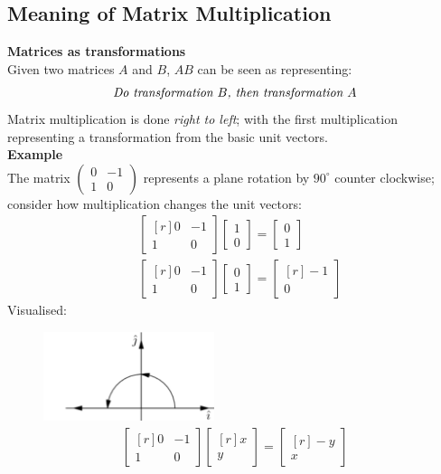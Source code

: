 \documentclass{report}
\begin{document}
\subsection{Meaning of Matrix Multiplication} %
\textbf{Matrices as transformations}\\
Given two matrices $A$ and $B$, $AB$ can be seen as 
representing:
\begin{equation*}
\text{\textit{Do transformation $B$, then transformation $A$}}
\end{equation*}
Matrix multiplication is done \textit{right to left}; with the first multiplication representing
a transformation from the basic unit vectors.\\
\textbf{Example}\\
The matrix $\left(\begin{smallmatrix}0&-1\\1&0\end{smallmatrix}\right)$ represents a 
plane rotation by $90^{\circ}$ counter clockwise;
consider how multiplication changes the unit vectors:
\begin{align*}
&\begin{bmatrix*}[r]
0&-1\\1&0
\end{bmatrix*}
\begin{bmatrix}
1\\0
\end{bmatrix}
=\begin{bmatrix}
0\\1
\end{bmatrix}\\
&\begin{bmatrix*}[r]
0&-1\\1&0
\end{bmatrix*}
\begin{bmatrix}
0\\1
\end{bmatrix}
=\begin{bmatrix*}[r]
-1\\0
\end{bmatrix*}
\end{align*}
Visualised:
\begin{figure}[h]
\includegraphics[width=5cm]{Capture79}\\
\centering
\begin{align*}
\begin{bmatrix*}[r]
0&-1\\1&0
\end{bmatrix*}
\begin{bmatrix*}[r]
x\\y
\end{bmatrix*}
=\begin{bmatrix*}[r]
-y\\x
\end{bmatrix*}
\end{align*}
\end{figure}\\
\end{document}

